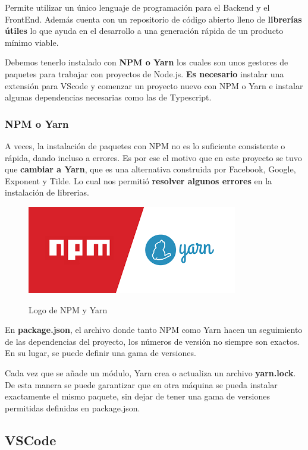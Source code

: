 \documentclass[12pt,twoside,titlepage]{report}
\begin{document}
Permite utilizar un único lenguaje de programación para el Backend y el FrontEnd. Además cuenta con un repositorio de código abierto lleno de \textbf{librerías útiles} lo que ayuda en el desarrollo a una generación rápida de un producto mínimo viable.

Debemos tenerlo instalado con \textbf{NPM o Yarn} los cuales son unos gestores de paquetes para trabajar con proyectos de Node.js. \textbf{Es necesario} instalar una extensión para VScode y comenzar un proyecto nuevo con NPM o Yarn e instalar algunas dependencias necesarias como las de Typescript.

\subsubsection{NPM o Yarn}

A veces, la instalación de paquetes con NPM no es lo suficiente consistente o rápida, dando incluso a errores. Es por ese el motivo que en este proyecto se tuvo que \textbf{cambiar a Yarn}, que es una alternativa construida por Facebook, Google, Exponent y Tilde. Lo cual nos permitió \textbf{resolver algunos errores} en la instalación de librerias.

\begin{figure}[H]
    \centering
    \includegraphics[scale=0.4]{Nodejs/NPMvsYarn}
    \label{fig:NPMYarnLogo}
    \caption{Logo de NPM y Yarn}
\end{figure}

En \textbf{package.json}, el archivo donde tanto NPM como Yarn hacen un seguimiento de las dependencias del proyecto, los números de versión no siempre son exactos. En su lugar, se puede definir una gama de versiones.

Cada vez que se añade un módulo, Yarn crea o actualiza un archivo \textbf{yarn.lock}.
De esta manera se puede garantizar que en otra máquina se pueda instalar exactamente el mismo paquete, sin dejar de tener una gama de versiones permitidas definidas en package.json. 


\subsection{VSCode}
\end{document}

